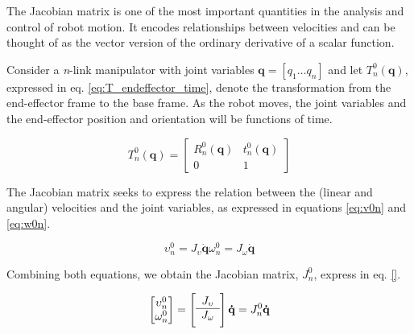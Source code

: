 The Jacobian matrix is one of the most important quantities in the analysis and control of robot motion. It encodes relationships between velocities and can be thought of as the vector version of the ordinary derivative of a scalar function.

Consider a \textit{n}-link manipulator with joint variables $\mathbf{q} = [q_1 \hdots q_n ]$ and let $T^0_n(\mathbf{q})$, expressed in eq. \ref{eq:T_endeffector_time}, denote the transformation from the end-effector frame to the base frame. As the robot moves, the joint variables and the end-effector position and orientation will be functions of time.

\begin{equation}
    T^0_n(\mathbf{q}) = 
    \begin{bmatrix}
        R^0_n(\mathbf{q}) & t^0_n(\mathbf{q}) \\
        0 & 1
    \end{bmatrix}
    \label{eq:T_endeffector_time}
\end{equation}

The Jacobian matrix seeks to express the relation between the (linear and angular) velocities and the joint variables, as expressed in equations \ref{eq:v0n} and \ref{eq:w0n}.

\begin{subequations}
    \begin{equation}
        \upsilon^0_n = J_{\upsilon} \mathbf{\dot{q}}
        \label{eq:v0n}
    \end{equation}
    \begin{equation}
	\omega^0_n = J_{\omega} \mathbf{\dot{q}}
        \label{eq:w0n}
    \end{equation}
\end{subequations}

Combining both equations, we obtain the Jacobian matrix, $J_n^0$, express in eq. \ref{}.

\begin{equation}
	\begin{bmatrix}
		\upsilon_n^0 \\
		\omega_n^0
	\end{bmatrix}
	=
        \left[\begin{array}{c} 
	    J_{\upsilon} \\ \hline \vspace{0.1cm}
            J_{\omega}
        \end{array}\right]
	\mathbf{\dot{q}}
	= J_n^0 \mathbf{\dot{q}}
\end{equation}

